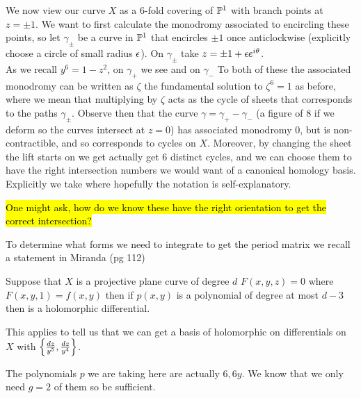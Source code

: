 \documentclass{article}
\begin{document}
We now view our curve $X$ as a 6-fold covering of $\mathbb{P}^1$ with branch points at $z=\pm 1$. We want to first calculate the monodromy associated to encircling these points, so let $\gamma_\pm$ be a curve in $\mathbb{P}^1$ that encircles $\pm 1$ once anticlockwise (explicitly choose a circle of small radius $\epsilon$). On $\gamma_\pm$ take $z = \pm1 + \epsilon e^{i\theta}$. \\
As we recall $y^6 = 1-z^2$, on $\gamma_+$ we see 
and on $\gamma_-$ 
To both of these the associated monodromy can be written as $\zeta$ the fundamental solution to $\zeta^6=1$ as before, where we mean that multiplying by $\zeta$ acts as the cycle of sheets that corresponds to the paths $\gamma_\pm$. Observe then that the curve $\gamma = \gamma_+ - \gamma_-$ (a figure of 8 if we deform so the curves intersect at $z=0$) has associated monodromy 0, but is non-contractible, and so corresponds to cycles on $X$. Moreover, by changing the sheet the lift starts on we get actually get $6$ distinct cycles, and we can choose them to have the right intersection numbers we would want of a canonical homology basis. Explicitly we take
where hopefully the notation is self-explanatory. 
\begin{remark}
	\hl{One might ask, how do we know these have the right orientation to get the correct intersection?}
\end{remark}
To determine what forms we need to integrate to get the period matrix we recall a statement in Miranda (pg 112)
\begin{lemma}
	Suppose that $X$ is a projective plane curve of degree $d$ $F(x,y,z)=0$ where $F(x,y,1)=f(x,y)$ then if $p(x,y)$ is a polynomial of degree at most $d-3$ then 
	is a holomorphic differential. 
\end{lemma}
This applies to tell us that we can get a basis of holomorphic on differentials on $X$ with $\left\{ \frac{dz}{y^5}, \frac{dz}{y^4} \right\}$. 
\begin{remark}
	The polynomials $p$ we are taking here are actually $6, 6y$. We know that we only need $g=2$ of them so be sufficient. 	
\end{remark}
\end{document}
